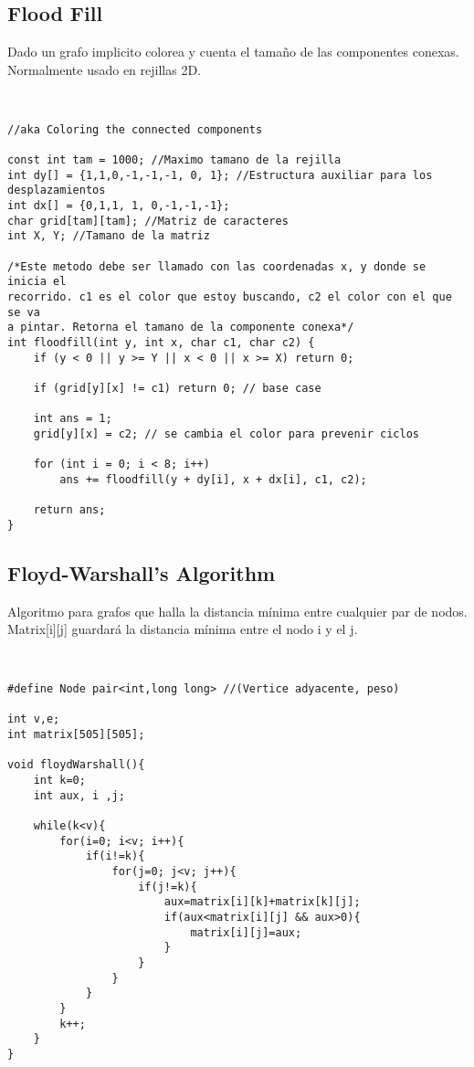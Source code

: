 \documentclass[11pt,letterpaper,twocolumn,twosided]{article}
\begin{document}
\subsection{Flood Fill}
Dado un grafo implicito colorea y cuenta el tama\~no de las componentes conexas. Normalmente usado en rejillas 2D.
\begin{lstlisting}


//aka Coloring the connected components

const int tam = 1000; //Maximo tamano de la rejilla
int dy[] = {1,1,0,-1,-1,-1, 0, 1}; //Estructura auxiliar para los desplazamientos
int dx[] = {0,1,1, 1, 0,-1,-1,-1};
char grid[tam][tam]; //Matriz de caracteres
int X, Y; //Tamano de la matriz

/*Este metodo debe ser llamado con las coordenadas x, y donde se inicia el 
recorrido. c1 es el color que estoy buscando, c2 el color con el que se va 
a pintar. Retorna el tamano de la componente conexa*/
int floodfill(int y, int x, char c1, char c2) { 
	if (y < 0 || y >= Y || x < 0 || x >= X) return 0;
	
	if (grid[y][x] != c1) return 0; // base case
	
	int ans = 1; 
	grid[y][x] = c2; // se cambia el color para prevenir ciclos
	
	for (int i = 0; i < 8; i++)
		ans += floodfill(y + dy[i], x + dx[i], c1, c2);
	
	return ans;
}
\end{lstlisting}

\subsection{Floyd-Warshall's Algorithm}
Algoritmo para grafos que halla la distancia m\'inima entre cualquier par de nodos. Matrix[i][j] guardar\'a la distancia m\'inima entre el nodo i y el j.
\begin{lstlisting}


#define Node pair<int,long long> //(Vertice adyacente, peso)

int v,e;
int matrix[505][505];

void floydWarshall(){
    int k=0;
    int aux, i ,j;
    
    while(k<v){
        for(i=0; i<v; i++){
            if(i!=k){
                for(j=0; j<v; j++){
                    if(j!=k){
                        aux=matrix[i][k]+matrix[k][j];
                        if(aux<matrix[i][j] && aux>0){ 
                            matrix[i][j]=aux;
                        }
                    }
                }
            }
        }
        k++;
    }
}\end{lstlisting}
\end{document}
